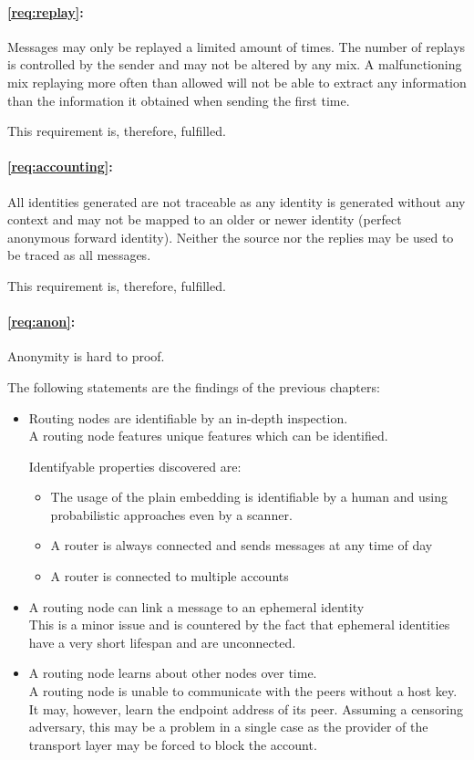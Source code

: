 \paragraph*{\ref{req:replay}:} Messages may only be replayed a limited amount of times. The number of replays is controlled by the sender and may not be altered by any mix. A malfunctioning mix replaying more often than allowed will not be able to extract any information than the information it obtained when sending the first time. 

This requirement is, therefore, fulfilled.

\paragraph*{\ref{req:accounting}:} 
All identities generated are not traceable as any identity is generated without any context and may not be mapped to an older or newer identity (perfect anonymous forward identity). Neither the source nor the replies may be used to be traced as all messages. 

This requirement is, therefore, fulfilled.

\paragraph*{\ref{req:anon}:} Anonymity is hard to proof. 

The following statements are the findings of the previous chapters:
\begin{itemize}
	\item Routing nodes are identifiable by an in-depth inspection.\\
	A routing node features unique features which can be identified. 
	
	Identifyable properties discovered are:
	\begin{itemize}
		\item The usage of the plain embedding is identifiable by a human and using probabilistic approaches even by a scanner.
		\item A router is always connected and sends messages at any time of day
		\item A router is connected to multiple accounts
	\end{itemize}
	\item A routing node can link a message to an ephemeral identity\\
	This is a minor issue and is countered by the fact that ephemeral identities have a very short lifespan and are unconnected.
	\item A routing node learns about other nodes over time.\\
	A routing node is unable to communicate with the peers without a host key. It may, however, learn the endpoint address of its peer. Assuming a censoring adversary, this may be a problem in a single case as the provider of the transport layer may be forced to block the account.
\end{itemize}

